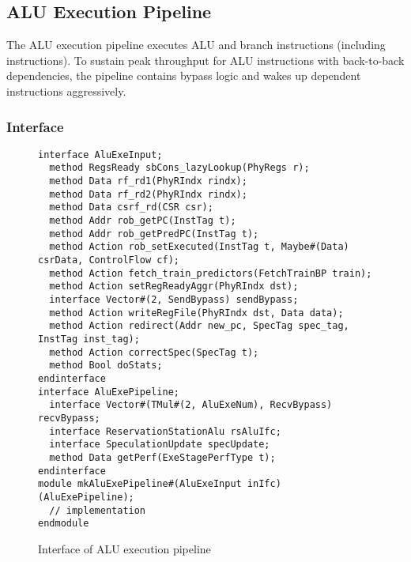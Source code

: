 \subsection{ALU Execution Pipeline}

The ALU execution pipeline executes ALU and branch instructions (including  instructions).
To sustain peak throughput for ALU instructions with back-to-back dependencies, the pipeline contains bypass logic and wakes up dependent instructions aggressively.

\subsubsection{Interface}

\begin{figure}
\begin{lstlisting}[caption={}]
interface AluExeInput;
  method RegsReady sbCons_lazyLookup(PhyRegs r);
  method Data rf_rd1(PhyRIndx rindx);
  method Data rf_rd2(PhyRIndx rindx);
  method Data csrf_rd(CSR csr);
  method Addr rob_getPC(InstTag t);
  method Addr rob_getPredPC(InstTag t);
  method Action rob_setExecuted(InstTag t, Maybe#(Data) csrData, ControlFlow cf);
  method Action fetch_train_predictors(FetchTrainBP train);
  method Action setRegReadyAggr(PhyRIndx dst);
  interface Vector#(2, SendBypass) sendBypass;
  method Action writeRegFile(PhyRIndx dst, Data data);
  method Action redirect(Addr new_pc, SpecTag spec_tag, InstTag inst_tag);
  method Action correctSpec(SpecTag t);
  method Bool doStats;
endinterface
interface AluExePipeline;
  interface Vector#(TMul#(2, AluExeNum), RecvBypass) recvBypass;
  interface ReservationStationAlu rsAluIfc;
  interface SpeculationUpdate specUpdate;
  method Data getPerf(ExeStagePerfType t);
endinterface
module mkAluExePipeline#(AluExeInput inIfc)(AluExePipeline);
  // implementation
endmodule
\end{lstlisting}
\caption{Interface of ALU execution pipeline}\label{fig:alu-exe-pipe-ifc}
\end{figure}

